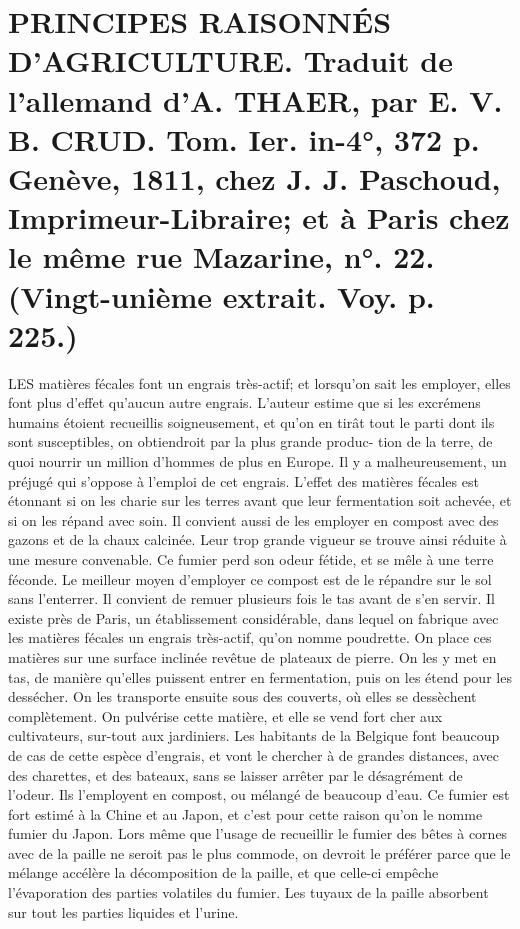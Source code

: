 \setcounter{page}{296}
\section{PRINCIPES RAISONNÉS D'AGRICULTURE. Traduit de l'allemand d'A. THAER, par E. V. B. CRUD. Tom. Ier. in-4°, 372 p. Genève, 1811, chez J. J. Paschoud, Imprimeur-Libraire; et à Paris chez le même rue Mazarine, n°. 22. \large{(Vingt-unième extrait. Voy. p. 225.)}}
LES matières fécales font un engrais très-actif; et lorsqu'on sait les employer, elles font plus d'effet qu'aucun autre engrais. L'auteur estime que si les excrémens humains étoient recueillis soigneusement, et qu'on en tirât tout le parti dont ils sont susceptibles, on obtiendroit par la plus grande produc-\setcounter{page}{297} tion de la terre, de quoi nourrir un million d'hommes de plus en Europe. Il y a malheureusement, un préjugé qui s'oppose à l'emploi de cet engrais.
L'effet des matières fécales est étonnant si on les charie sur les terres avant que leur fermentation soit achevée, et si on les répand avec soin. Il convient aussi de les employer en compost avec des gazons et de la chaux calcinée. Leur trop grande vigueur se trouve ainsi réduite à une mesure convenable. Ce fumier perd son odeur fétide, et se mêle à une terre féconde. Le meilleur moyen d'employer ce compost est de le répandre sur le sol sans l'enterrer. Il convient de remuer plusieurs fois le tas avant de s'en servir.
Il existe près de Paris, un établissement considérable, dans lequel on fabrique avec les matières fécales un engrais très-actif, qu'on nomme poudrette. On place ces matières sur une surface inclinée revêtue de plateaux de pierre. On les y met en tas, de manière qu'elles puissent entrer en fermentation, puis on les étend pour les dessécher. On les transporte ensuite sous des couverts, où elles se dessèchent complètement. On pulvérise cette matière, et elle se vend fort cher aux cultivateurs, sur-tout aux jardiniers.\setcounter{page}{298} Les habitants de la Belgique font beaucoup de cas de cette espèce d’engrais, et vont le chercher à de grandes distances, avec des charettes, et des bateaux, sans se laisser arrêter par le désagrément de l’odeur. Ils l’employent en compost, ou mélangé de beaucoup d’eau. Ce fumier est fort estimé à la Chine et au Japon, et c’est pour cette raison qu’on le nomme fumier du Japon.
Lors même que l’usage de recueillir le fumier des bêtes à cornes avec de la paille ne seroit pas le plus commode, on devroit le préférer parce que le mélange accélère la décomposition de la paille, et que celle-ci empêche l’évaporation des parties volatiles du fumier. Les tuyaux de la paille absorbent sur tout les parties liquides et l’urine.
